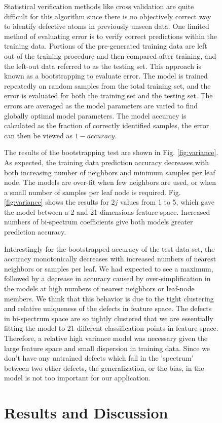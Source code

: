 \documentclass[12pt]{iopart}
\begin{document}
\begin{figure}[htbp]
Statistical verification methods like cross validation are quite difficult for this algorithm since there is no objectively correct way to identify defective atoms in previously unseen data. One limited method of evaluating error is to verify correct predictions within the training data. Portions of the pre-generated training data are left out of the training procedure and then compared after training, and the left-out data referred to as the testing set. This approach is known as a bootstrapping to evaluate error. The model is trained repeatedly on random samples from the total training set, and the error is evaluated for both the training set and the testing set. The errors are averaged as the model parameters are varied to find globally optimal model parameters. The model accuracy is calculated as the fraction of correctly identified samples, the error can then be viewed as $1-accuracy$.

The results of the bootstrapping test are shown in Fig. \ref{fig:variance}. As expected, the training data prediction accuracy decreases with both increasing number of neighbors and minimum samples per leaf node. The models are over-fit when few neighbors are used, or when a small number of samples per leaf node is required. Fig. \ref{fig:variance} shows the results for $2j$ values from 1 to 5, which gave the model between a 2 and 21 dimensions feature space. Increased numbers of bi-spectrum coefficients give both models greater prediction accuracy.

Interestingly for the bootstrapped accuracy of the test data set, the accuracy monotonically decreases with increased numbers of nearest neighbors or samples per leaf. We had expected to see a maximum, followed by a decrease in accuracy caused by over-simplification in the models at high numbers of nearest neighbors or leaf-node members. We think that this behavior is due to the tight clustering and relative uniqueness of the defects in feature space. The defects in bi-spectrum space are so tightly clustered that we are essentially fitting the model to 21 different classification points in feature space. Therefore, a relative high variance model was necessary given the large feature space and small dispersion in training data. Since we don't have any untrained defects which fall in the 'spectrum' between two other defects, the generalization, or the bias, in the model is not too important for our application.

\section{Results and Discussion}


\end{figure}
\end{document}
